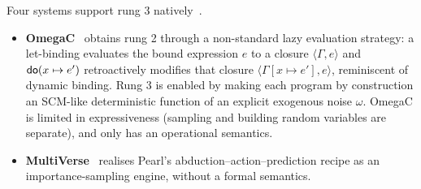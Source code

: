 \documentclass[11pt,a4paper]{article}
\begin{document}

Four systems support rung 3 natively~\cite{tavares2021language,chirho,perov2020multiverse,kiesel2023whatif}. 
\begin{itemize}
    \item \textbf{OmegaC}~\cite{tavares2021language} obtains rung 2 through a non-standard lazy evaluation strategy: a let-binding evaluates the bound expression $e$ to a closure $\langle \Gamma, e \rangle$ and $\mathsf{do}(x \mapsto e')$ retroactively modifies that closure $\langle \Gamma[x \mapsto e'], e\rangle$, reminiscent of dynamic binding. Rung 3 is enabled by making each program by construction an SCM-like deterministic function of an explicit exogenous noise $\omega$. OmegaC is limited in expressiveness (sampling and building random variables are separate), and only has an operational semantics. 
    \item \textbf{MultiVerse}~\cite{perov2020multiverse} realises Pearl's abduction--action--prediction recipe as an importance-sampling engine, without a formal semantics. 

\end{itemize}
\end{document}
